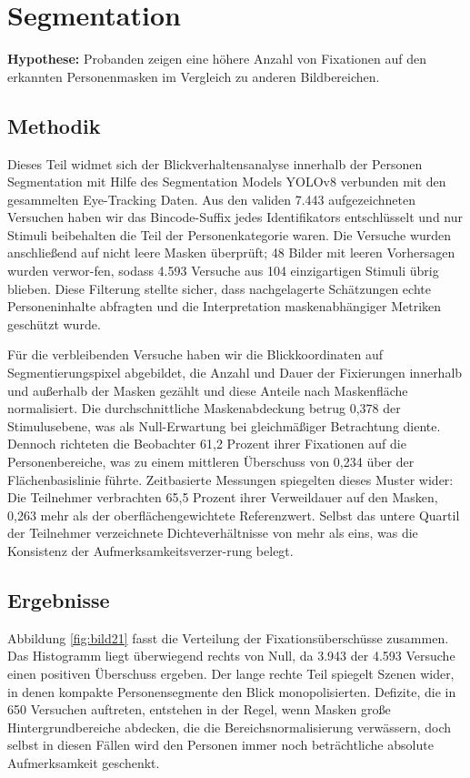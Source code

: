 \documentclass[
    language=german, %
    thesis=seminar, %
    supervisor=postdoc, %
    multiauthor=true, %
    ]{settings/csssa-thesis}
\begin{document}
\section{Segmentation}

\textbf{Hypothese:} Probanden zeigen eine höhere Anzahl von Fixationen auf den erkannten Personenmasken im Vergleich zu anderen Bildbereichen.

\subsection{Methodik}
Dieses Teil widmet sich der Blickverhaltensanalyse innerhalb der Personen Segmentation mit Hilfe des Segmentation Models 
YOLOv8 verbunden mit den gesammelten Eye-Tracking Daten. Aus den validen 7.443 aufgezeichneten Versuchen haben wir das 
Bincode-Suffix jedes Identifikators entschlüsselt und nur Stimuli beibehalten die Teil der Personenkategorie waren. 
Die Versuche wurden anschlie{\ss}end auf nicht leere Masken überprüft; 48 Bilder mit leeren Vorhersagen wurden verwor-fen, 
sodass 4.593 Versuche aus 104 einzigartigen Stimuli übrig blieben. Diese Filterung stellte sicher, dass nachgelagerte 
Schätzungen echte Personeninhalte abfragten und die Interpretation maskenabhängiger Metriken geschützt wurde.

Für die verbleibenden Versuche haben wir die Blickkoordinaten auf Segmentierungspixel abgebildet, die Anzahl 
und Dauer der Fixierungen innerhalb und au{\ss}erhalb der Masken gezählt und diese Anteile nach Maskenfläche normalisiert. 
Die durchschnittliche Maskenabdeckung betrug 0,378 der Stimulusebene, was als Null-Erwartung bei gleichmä{\ss}iger 
Betrachtung diente. Dennoch richteten die Beobachter 61,2 Prozent ihrer Fixationen auf die Personenbereiche, 
was zu einem mittleren Überschuss von 0,234 über der Flächenbasislinie führte. Zeitbasierte Messungen spiegelten 
dieses Muster wider: Die Teilnehmer verbrachten 65,5 Prozent ihrer Verweildauer auf den Masken, 0,263 mehr als der 
oberflächengewichtete Referenzwert. Selbst das untere Quartil der Teilnehmer verzeichnete Dichteverhältnisse von 
mehr als eins, was die Konsistenz der Aufmerksamkeitsverzer-rung belegt.

\subsection{Ergebnisse}
Abbildung \ref{fig:bild21} fasst die Verteilung der Fixationsüberschüsse zusammen. Das Histogramm liegt überwiegend rechts von Null, 
da 3.943 der 4.593 Versuche einen positiven Überschuss ergeben. Der lange rechte Teil spiegelt Szenen wider, 
in denen kompakte Personensegmente den Blick monopolisierten. Defizite, die in 650 Versuchen auftreten, 
entstehen in der Regel, wenn Masken gro{\ss}e Hintergrundbereiche abdecken, die die Bereichsnormalisierung verwässern, 
doch selbst in diesen Fällen wird den Personen immer noch beträchtliche absolute Aufmerksamkeit geschenkt.
\end{document}
